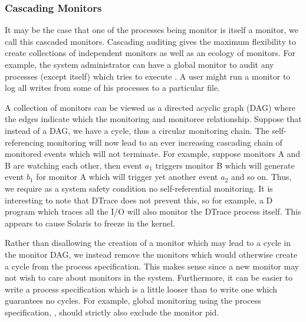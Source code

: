 \subsubsection{Cascading Monitors}
\label{sec:self}

It may be the case that one of the processes being monitor is
itself a monitor, we call this cascaded monitors.
Cascading auditing gives the maximum flexibility to create 
collections of independent monitors as well as an ecology
of monitors.
For example, the system administrator can have a global monitor to
audit any processes (except itself) which
tries to execute . 
A user might run a monitor to log all writes 
from some of his processes to a particular file.

A collection of monitors can be viewed as a directed acyclic graph (DAG)
where the edges indicate which the monitoring and monitoree relationship.
Suppose that instead of a DAG, we have a cycle, 
thus a circular monitoring chain. 
The self-referencing monitoring will now lead to an ever increasing cascading
chain of monitored events which will not terminate.
For example, suppose monitors A and B are watching each other, then
event $a_1$ triggers monitor B which will generate event $b_1$ for monitor
A which will trigger yet another event $a_2$ and so on.
Thus, we require as a system safety condition no self-referential monitoring.
It is interesting to note that DTrace does not prevent this, so for example,
a D program which traces all the  I/O will also monitor the DTrace
process itself. This appears to cause Solaris to freeze in the kernel.

Rather than disallowing the creation of a monitor which may lead to a cycle
in the monitor DAG, we instead remove the monitors which would otherwise
create a cycle from the process specification.
This makes sense since a new monitor may not wish to care about monitors
in the system. Furthermore, it can be easier to write a process specification
which is a little looser than to write one which guarantees no cycles.
For example, global monitoring using the process specification, ,
should strictly also exclude the monitor pid.


